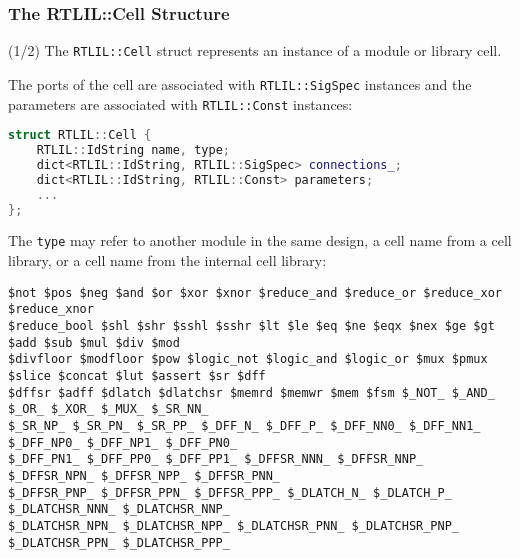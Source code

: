 \subsubsection{The RTLIL::Cell Structure}

\begin{frame}[t, fragile]{\subsubsecname (1/2)}
The {\tt RTLIL::Cell} struct represents an instance of a module or library cell.

\smallskip
The ports of the cell
are associated with {\tt RTLIL::SigSpec} instances and the parameters are associated with {\tt RTLIL::Const}
instances:

\bigskip
\begin{lstlisting}[xleftmargin=1cm, basicstyle=\ttfamily\fontsize{8pt}{10pt}\selectfont, language=C++]
struct RTLIL::Cell {
    RTLIL::IdString name, type;
    dict<RTLIL::IdString, RTLIL::SigSpec> connections_;
    dict<RTLIL::IdString, RTLIL::Const> parameters;
    ...
};
\end{lstlisting}

\bigskip
The {\tt type} may refer to another module in the same design, a cell name from a cell library, or a
cell name from the internal cell library:

\begin{lstlisting}[xleftmargin=1cm, basicstyle=\ttfamily\fontsize{6pt}{7pt}\selectfont]
$not $pos $neg $and $or $xor $xnor $reduce_and $reduce_or $reduce_xor $reduce_xnor
$reduce_bool $shl $shr $sshl $sshr $lt $le $eq $ne $eqx $nex $ge $gt $add $sub $mul $div $mod
$divfloor $modfloor $pow $logic_not $logic_and $logic_or $mux $pmux $slice $concat $lut $assert $sr $dff
$dffsr $adff $dlatch $dlatchsr $memrd $memwr $mem $fsm $_NOT_ $_AND_ $_OR_ $_XOR_ $_MUX_ $_SR_NN_
$_SR_NP_ $_SR_PN_ $_SR_PP_ $_DFF_N_ $_DFF_P_ $_DFF_NN0_ $_DFF_NN1_ $_DFF_NP0_ $_DFF_NP1_ $_DFF_PN0_
$_DFF_PN1_ $_DFF_PP0_ $_DFF_PP1_ $_DFFSR_NNN_ $_DFFSR_NNP_ $_DFFSR_NPN_ $_DFFSR_NPP_ $_DFFSR_PNN_
$_DFFSR_PNP_ $_DFFSR_PPN_ $_DFFSR_PPP_ $_DLATCH_N_ $_DLATCH_P_ $_DLATCHSR_NNN_ $_DLATCHSR_NNP_
$_DLATCHSR_NPN_ $_DLATCHSR_NPP_ $_DLATCHSR_PNN_ $_DLATCHSR_PNP_ $_DLATCHSR_PPN_ $_DLATCHSR_PPP_
\end{lstlisting}
\end{frame}

